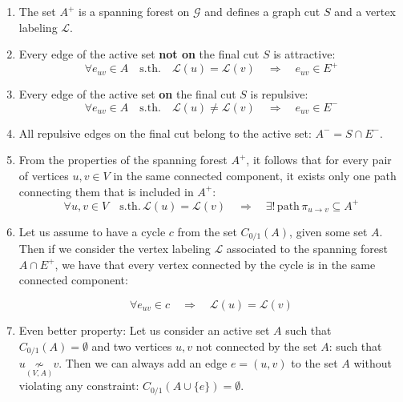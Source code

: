 \documentclass[12pt]{article}
\newcommand\TODO[1]{\fbox{\textcolor{red}{TODO: #1}}}
\begin{document}
\begin{enumerate}
\item The set $A^{+}$ is a spanning forest on $\mathcal{G}$ and defines a graph cut $S$ and a vertex labeling $\mathcal{L}$.
\item Every edge of the active set \textbf{not on} the final cut $S$ is attractive:
\begin{equation}
\forall e_{uv}\in A \quad \mathrm{s.th.}\quad \mathcal{L}(u)=\mathcal{L}(v) \quad \Longrightarrow \quad e_{uv} \in E^+
\end{equation}
\item Every edge of the active set \textbf{on} the final cut $S$ is repulsive:
\begin{equation}
\forall e_{uv} \in A \quad \mathrm{s.th.}\quad \mathcal{L}(u)\neq\mathcal{L}(v) \quad \Longrightarrow \quad e_{uv} \in E^-
\end{equation}



\item All repulsive edges on the final cut belong to the active set: ${A^{-} = S \cap E^{-}}$. %
\item From the properties of the spanning forest $A^+$, it follows that for every pair of vertices $u,v\in V$ in the same connected component, it exists only one path connecting them that is included in $A^+$:
\begin{equation}
\forall u,v \in V\quad \mathrm{s.th.} \, \mathcal{L}(u)=\mathcal{L}(v)\quad  \Longrightarrow \quad\exists ! \, \mathrm{path} \, \pi_{u \rightarrow v}\subseteq A^+
\end{equation}

\item Let us assume to have a cycle $c$ from the set $C_{0/1}(A)$, given some set $A$. Then if we consider the vertex labeling $\mathcal{L}$ associated to the spanning forest $A\cap E^+$, we have that every vertex connected by the cycle is in the same connected component:

\begin{equation}
\forall e_{uv} \in c \quad \Rightarrow \quad \mathcal{L}(u) = \mathcal{L}(v) 
\end{equation}

\item Even better property: Let us consider an active set $A$ such that $C_{0/1}(A) =  \emptyset$ and two vertices $u,v$ not connected by the set $A$: such that $u \underset{(V,A)}{\not\sim}v$. Then we can always add an edge $e = (u,v)$ to the set $A$ without violating any constraint: $C_{0/1}(A \cup \{e\}) =  \emptyset$.
\end{enumerate}
\end{document}
